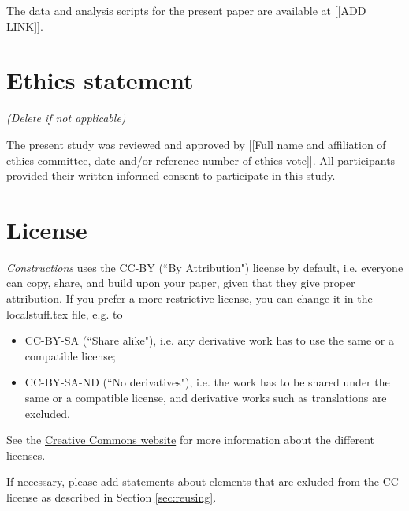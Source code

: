 The data and analysis scripts for the present paper are available at [[ADD LINK]].

\section*{Ethics statement}
\textit{(Delete if not applicable)}

\noindent The present study was reviewed and approved by [[Full name and affiliation of ethics committee, date and/or reference number of ethics vote]]. All participants provided their written informed consent to participate in this study.

\section*{License}
\doclicenseIcon \doclicenseText

\noindent \textit{Constructions} uses the CC-BY (``By Attribution") license by default, i.e. everyone can copy, share, and build upon your paper, given that they give proper attribution. If you prefer a more restrictive license, you can change it in the localstuff.tex file, e.g. to
\begin{itemize}
    \item CC-BY-SA (``Share alike"), i.e. any derivative work has to use the same or a compatible license;
    \item CC-BY-SA-ND (``No derivatives"), i.e. the work has to be shared under the same or a compatible license, and derivative works such as translations are excluded.
\end{itemize}

\noindent See the \href{https://creativecommons.org/}{Creative Commons website} for more information about the different licenses.

If necessary, please add statements about elements that are exluded from the CC license as described in Section \ref{sec:reusing}.



